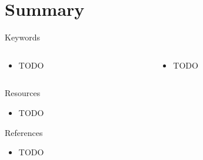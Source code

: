 \documentclass{curs}
\begin{document}
\section{Summary}

\begin{frame}{Keywords}
  \begin{columns}
    \begin{column}{0.5\textwidth}
      \begin{itemize}
        \item TODO
      \end{itemize}
    \end{column}
    \begin{column}{0.5\textwidth}
      \begin{itemize}
        \item TODO
      \end{itemize}
    \end{column}
  \end{columns}
\end{frame}

\begin{frame}{Resources}
  \begin{itemize}
    \item TODO
  \end{itemize}
\end{frame}

\begin{frame}{References}
  \begin{itemize}
    \item TODO
  \end{itemize}
\end{frame}
\end{document}
